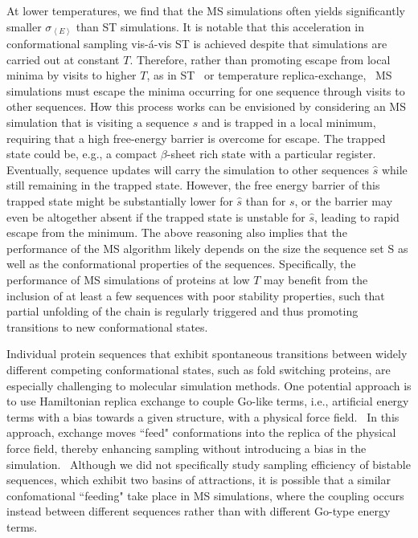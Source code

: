 \documentclass[
aip,
rsi,%
amsmath,amssymb,
reprint,%
]{revtex4-1}
\newcommand {\sigE}	{{\sigma_{\left < E \right >}}}
\begin{document}
At lower temperatures, we find that the MS simulations often yields significantly smaller $\sigE$ than ST simulations. It is notable that this acceleration in conformational sampling vis-{\'a}-vis ST is achieved despite that simulations are carried out at constant $T$. {\color{red} Therefore, rather than promoting escape from local minima by visits to higher $T$, as in  ST~\cite{Marinari1992,Lyubartsev1992} or temperature replica-exchange,~\cite{Swendsen1986} MS simulations must escape the minima occurring for one sequence through visits to other sequences. How this process works can be envisioned by considering an MS simulation that is visiting a sequence $s$ and is trapped in a local minimum, requiring that a high free-energy barrier is overcome for escape. The trapped state could be, e.g., a compact $\beta$-sheet rich state with a particular register. Eventually, sequence updates will carry the simulation to other sequences $\hat{s}$ while still remaining in the trapped state. However, the free energy barrier of this trapped state might be substantially lower for $\hat{s}$ than for $s$, or the barrier may even be altogether absent if the trapped state is unstable for $\hat{s}$, leading to rapid escape from the minimum. } The above reasoning also implies that the performance of the MS algorithm likely depends on the size the sequence set S as well as the conformational properties of the sequences. Specifically, the performance of MS simulations of proteins at low $T$ may benefit from the inclusion of at least a few sequences with poor stability properties, such that partial unfolding of the chain is regularly triggered and thus promoting transitions to new conformational states. 

{\color{red} Individual protein sequences that exhibit spontaneous transitions between widely different competing conformational states, such as fold switching proteins, are especially challenging to molecular simulation methods. One potential approach is to use Hamiltonian replica exchange to couple Go-like terms, i.e., artificial energy terms with a bias towards a given structure, with a physical force field.~\cite{Meinke2007,Chen2014,Bernhardt2016} In this approach, exchange moves ``feed" conformations into the replica of the physical force field, thereby enhancing sampling without introducing a bias in the simulation.~\cite{Bernhardt2016} Although we did not specifically study sampling efficiency of bistable sequences, which exhibit two basins of attractions, it is possible that a similar confomational ``feeding" take place in MS simulations, where the coupling occurs instead between different sequences rather than with different Go-type energy terms. }
\end{document}
